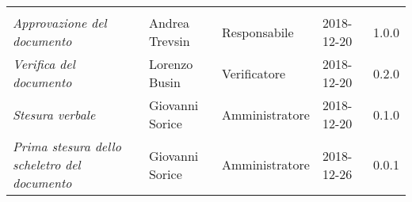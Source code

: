 \newpage 
\section*{}
\begin{table}[H]
	\centering
	\begin{tabular}{p{4cm}|C{3cm}|C{3cm}|R{2.5cm}|R{2cm}}
		
		 & & & & \\
		
		
		\emph{Approvazione del documento} &  Andrea Trevsin & Responsabile & 2018-12-20 & 1.0.0 \\
		\hline
		
		\emph{Verifica del documento} & Lorenzo Busin & Verificatore & 2018-12-20 & 0.2.0 \\
		\hline

		\emph{Stesura verbale} & Giovanni Sorice & Amministratore & 2018-12-20 & 0.1.0 \\
		\hline
		
		\emph{Prima stesura dello scheletro del documento} & Giovanni Sorice & Amministratore & 2018-12-26 & 0.0.1 \\
		
	\end{tabular}
	
\end{table}


\clearpage